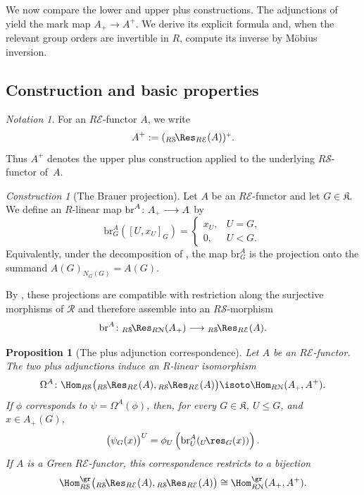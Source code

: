 \documentclass{amsart}
\numberwithin{equation}{section}%
\newtheorem{Prop}[equation]{Proposition}
\theoremstyle{remark}
\newtheorem{Not}[equation]{Notation}
\newtheorem{Cons}[equation]{Construction}
\theoremstyle{definition}
\newcommand{\e}{\mathcal E}
\newcommand{\s}{\mathcal S}
\newcommand{\n}{\mathcal N}
\newcommand{\lres}[1]{{}_{#1}\!\res}
\newcommand{\lRes}[1]{{}_{#1}\!\Res}
\newcommand{\iRes}[2]{{}_{#1}\!\Res_{#2}}
\newcommand{\br}{\text{br}}
\begin{document}
We now compare the lower and upper plus constructions.
The adjunctions of
yield the mark map $A_+\to A^+$.
We derive its explicit formula and, when the relevant group
orders are invertible in $R$, compute its inverse by
Möbius inversion.

%
\subsection{Construction and basic properties}
\label{ssec:mark-map}
%

\begin{Not}
\label{not:upper-plus-E-functor}
For an $R\e$-functor $A$, we write
%
\[
A^+
:=
\Bup[(\iRes{R\s}{R\e}(A))].
\]
%
Thus $A^+$ denotes the upper plus construction applied to the
underlying $R\s$-functor of~$A$.
\end{Not}
%
\begin{Cons}[The Brauer projection]
\label{con:Brauer-projection}
Let $A$ be an $R\e$-functor and let $G\in\mathfrak K$.
We define an $R$-linear map
$\br^A
\colon
\Alp
\longrightarrow
A$
by
%
\[
\br_G^A([U,x_U]_G)
=
\begin{cases}
	x_U,& U=G,\\
	0,& U<G.
\end{cases}
\]
%
Equivalently, under the decomposition of
, the map $\br_G^A$ is the
projection onto the summand
$A(G)_{N_G(G)}=A(G)$.
\end{Cons}
%
By , these projections are compatible
with restriction along the surjective morphisms of $\mathcal R$ and
therefore assemble into an $R\s$-morphism
%
\[
\br^A\colon
\lRes{R\s}_{R\n}(A_+)
\longrightarrow
\lRes{R\s}_{R\e}(A).
\]
%
\begin{Prop}[The plus adjunction correspondence]
\label{prop:plus-adjunction-correspondence}
Let $A$ be an $R\e$-functor.
The two plus adjunctions induce an $R$-linear isomorphism
\[
\Omega^A\colon
\Hom_{R\s}
\bigl(
\iRes{R\s}{R\e}(A),
\iRes{R\s}{R\e}(A)
\bigr)
\isoto
\Hom_{R\n}(\Alp,A^+).
\]
%
If $\phi$ corresponds to
$\psi=\Omega^A(\phi)$, then, for every
$G\in\mathfrak K$, $U\leq G$, and $x\in A_+(G)$,
%
\[
\bigl(\psi_G(x)\bigr)^U
=
\phi_U
\left(
\br_U^A({}\lres{U}_G(x))
\right).
\]
%
If $A$ is a Green $R\e$-functor, this correspondence
restricts to a bijection
%
\[
\Hom_{R\s}^{\gr}
\bigl(
\iRes{R\s}{R\e}(A),
\iRes{R\s}{R\e}(A)
\bigr)
\cong
\Hom_{R\n}^{\gr}(A_+,A^+).
\]
%
\end{Prop}
\end{document}
